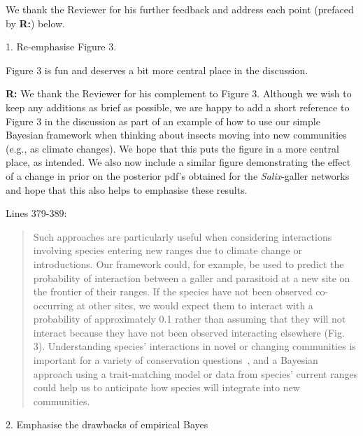 \documentclass[12pt]{letter}
\newenvironment{refquote}{\bigskip \begin{it}}{\end{it}\smallskip}
\begin{document}
	We thank the Reviewer for his further feedback and address each point (prefaced by \textbf{R:}) below.

	1. Re-emphasise Figure 3. 

		\begin{refquote}

			Figure 3 is fun and deserves a bit more central place in the discussion. 

		\end{refquote}


		\textbf{R:} We thank the Reviewer for his complement to Figure 3. Although we wish to keep any additions as brief as possible, we are happy to add a short reference to Figure 3 in the discussion as part of an example of how to use our simple Bayesian framework when thinking about insects moving into new communities (e.g., as climate changes). We hope that this puts the figure in a more central place, as intended. We also now include a similar figure demonstrating the effect of a change in prior on the posterior pdf's obtained for the \emph{Salix}-galler networks and hope that this also helps to emphasise these results.


		Lines 379-389:

		\begin{quotation}

			Such approaches are particularly useful when considering interactions involving species entering new ranges due to climate change or introductions. Our framework could, for example, be used to predict the probability of interaction between a galler and parasitoid at a new site on the frontier of their ranges. If the species have not been observed co-occurring at other sites, we would expect them to interact with a probability of approximately 0.1 rather than assuming that they will not interact because they have not been observed interacting elsewhere (Fig. 3). Understanding species' interactions in novel or changing communities is important for a variety of conservation questions~\citep{Bartomeus2013,Gravel2013}, and a Bayesian approach using a trait-matching model or data from species' current ranges could help us to anticipate how species will integrate into new communities. 

		\end{quotation}


	2. Emphasise the drawbacks of empirical Bayes
\end{document}
